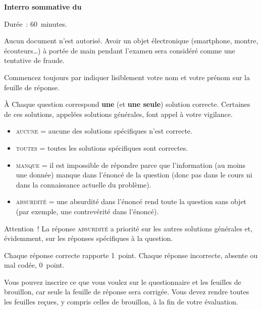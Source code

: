 \documentclass[11pt,french,a4paper,twoside]{article}
\newcommand{\thesubtitle}{Interro sommative du \thedate{}}
\begin{document}
\begin{examcopy}[2]
	\setcounter{figure}{0}
	{\bf \thetitle{} \hfill{} \thesubtitle{}}

	\vspace{2ex}

	Durée~: 60~minutes.

	Aucun document n'est autorisé.
	Avoir un objet électronique (smartphone, montre, écouteurs\ldots{}) à portée de main pendant l'examen sera considéré comme une tentative de fraude.

	Commencez toujours par indiquer lisiblement votre nom et votre prénom sur la feuille de réponse.

	À Chaque question correspond \textbf{une} (et \textbf{une seule}) solution correcte.
	Certaines de ces solutions, appelées solutions générales, font appel à votre vigilance.
	\begin{itemize}
		\item \textsc{aucune} = aucune des solutions spécifiques n'est correcte.
		\item \textsc{toutes} = toutes les solutions spécifiques sont correctes.
		\item \textsc{manque} = il est impossible de répondre parce que l'information (au moins une donnée) manque dans l'énoncé de la question (donc pas dans le cours ni dans la connaissance actuelle du problème).
		\item \textsc{absurdité} = une absurdité dans l'énoncé rend toute la question sans objet (par exemple, une contrevérité dans l'énoncé).
	\end{itemize}
	Attention~! La réponse \textsc{absurdité} a priorité sur les autres solutions générales et, évidemment, sur les réponses spécifiques à la question.

	Chaque réponse correcte rapporte 1~point. Chaque réponse incorrecte, absente ou mal codée, 0~point.

	Vous pouvez inscrire ce que vous voulez sur le questionnaire et les feuilles de brouillon, car seule la feuille de réponse sera corrigée.
	Vous devez rendre toutes les feuilles reçues, y compris celles de brouillon, à la fin de votre évaluation.

	\hrulefill{}

	\vspace{2ex}





\end{examcopy}
\end{document}

